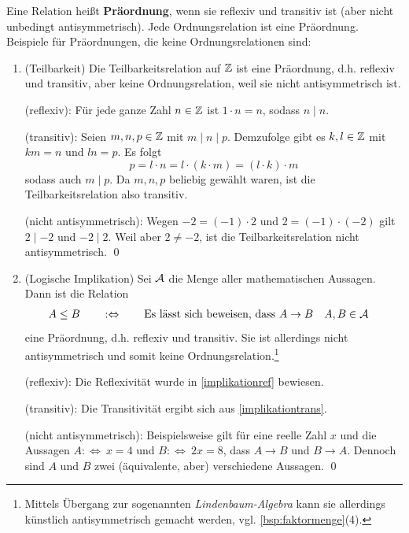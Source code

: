 \begin{bsp}[Präordnungen] 
    Eine Relation heißt \textbf{Präordnung}, wenn sie reflexiv und transitiv ist (aber nicht unbedingt antisymmetrisch). Jede Ordnungsrelation ist eine Präordnung. Beispiele für Präordnungen, die keine Ordnungsrelationen sind:
    \begin{enumerate}
        \item(Teilbarkeit) Die Teilbarkeitsrelation auf $\mathbb Z$ ist eine Präordnung, d.h. reflexiv und transitiv, aber keine Ordnungsrelation, weil sie nicht antisymmetrisch ist.
        \begin{bew}
            (reflexiv): Für jede ganze Zahl $n\in \mathbb Z$ ist $1\cdot n=n$, sodass $n\mid n$.

            (transitiv): Seien $m,n,p\in \mathbb Z$ mit $m\mid n\mid p$. Demzufolge gibt es $k,l\in \mathbb Z$ mit $km=n$ und $ln=p$. Es folgt
                \[ p = l\cdot n = l\cdot (k\cdot m) = (l\cdot k)\cdot m \]
            sodass auch $m\mid p$. Da $m,n,p$ beliebig gewählt waren, ist die Teilbarkeitsrelation also transitiv.

            (nicht antisymmetrisch): Wegen $-2=(-1)\cdot 2$ und $2=(-1)\cdot (-2)$ gilt $2\mid -2$ und $-2\mid 2$. Weil aber $2\neq -2$, ist die Teilbarkeitsrelation nicht antisymmetrisch. \qed
        \end{bew}
        \item(Logische Implikation) Sei $\mathcal A$ die Menge aller mathematischen Aussagen. Dann ist die Relation
        \begin{align*}
            A\le B \qquad &:\Leftrightarrow\qquad  \text{Es lässt sich beweisen, dass $A\to B$} && A,B\in \mathcal A
        \end{align*}
        eine Präordnung, d.h. reflexiv und transitiv. Sie ist allerdings nicht antisymmetrisch und somit keine Ordnungsrelation.\footnote{Mittels Übergang zur sogenannten \emph{Lindenbaum-Algebra} kann sie allerdings künstlich antisymmetrisch gemacht werden, vgl. \cref{bsp:faktormenge}(4).}
        \begin{bew}
            (reflexiv): Die Reflexivität wurde in \cref{implikationref} bewiesen.

            (transitiv): Die Transitivität ergibt sich aus \cref{implikationtrans}.

            (nicht antisymmetrisch): Beispielsweise gilt für eine reelle Zahl $x$ und die Aussagen $A:\Leftrightarrow\ x=4$ und $B:\Leftrightarrow\ 2x=8$, dass $A\to B$ und $B\to A$. Dennoch sind $A$ und $B$ zwei (äquivalente, aber) verschiedene Aussagen. \qed
        \end{bew}
    \end{enumerate}
\end{bsp}


